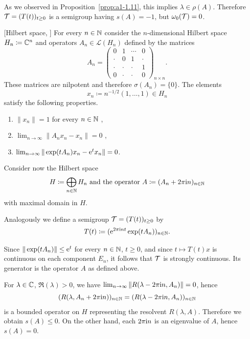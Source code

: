 As we observed in Proposition~\ref{prop:a1-1.11}, this implies $\lambda \in \rho(A)$.
Therefore $\TT = (T(t))_{t\geq 0}$ is a semigroup having $s(A) = -1$, but $\omega_{0}(\mathcal{T}) = 0$.
\begin{example}\label{ex:a3-1.4}[Hilbert space, \textcite{zabczyk:1975}]
For every $n \in \mathbb{N}$ consider the $n$-dimensional Hilbert space $H_{n} \coloneq \mathbb{C}^{n}$ and operators $A_{n} \in \mathcal{L}(H_{n})$ defined by the matrices
\[
    A_{n} =
    \begin{pmatrix}
    0 & 1 & \cdots & 0 \\
    \cdot & 0 & 1 & \cdot \\
    \cdot & \cdot & \cdot & 1 \\
    0 & \cdot & \cdot & 0
    \end{pmatrix}_{n \times n} .
\]
These matrices are nilpotent and therefore $\sigma(A_{n}) = \{0\}$.
The elements 
\[
	x_{n} \coloneq n^{-1/2}(1, \ldots, 1) \in H_{n}
\]
satisfy the following properties.
\begin{enumerate}[\upshape (i)]
\item
	$\|x_{n}\| = 1$ for every $n \in \mathbb{N}$ , 

\item
	$\lim_{n \to \infty} \|A_{n}x_{n} - x_{n}\| = 0$ , 

\item
	$\lim_{n \to \infty} \|\exp(tA_{n})x_{n} - \mathrm{e}^{t}x_{n}\| = 0$. 

\end{enumerate}
Consider now the Hilbert space 
%
\[
	\text{$H \coloneq \bigoplus_{n \in \mathbb{N}} H_{n}$ and the operator 
		$A \coloneq (A_{n} + 2\pi\mathrm{i} n)_{n \in \mathbb{N}}$}
\]
%
with maximal domain in $H$.

Analogously we define a semigroup $\TT = (T(t))_{t \geq 0}$ by
\[
    T(t) \coloneq (\mathrm{e}^{2\pi\mathrm{i} nt}\exp(tA_{n}))_{n \in \mathbb{N}} .
\]
\end{example}
Since $\|\exp(tA_{n})\| \leq \eu^{t}$ for every $n \in \mathbb{N}$, $t \geq 0$, and since $t \mapsto T(t)x$ is continuous on each component $E_{n}$, it follows that $\mathcal{T}$ is strongly continuous.
Its generator is the operator $A$ as defined above.

For $\lambda \in \mathbb{C}$, $\Re(\lambda) > 0$, we have 
$\lim_{n \to \infty} \|R(\lambda-2\pi\mathrm{i} n,A_{n})\| = 0$, hence
\[
    (R(\lambda,A_{n}+2\pi\mathrm{i} n))_{n \in \mathbb{N}} = (R(\lambda-2\pi\mathrm{i} n,A_{n}))_{n \in \mathbb{N}}
\]
is a bounded operator on $H$ representing the resolvent $R(\lambda,A)$.
Therefore we obtain $s(A) \leq 0$.
On the other hand, each $2\pi\mathrm{i} n$ is an eigenvalue of\/ $A$, hence $s(A) = 0$.

